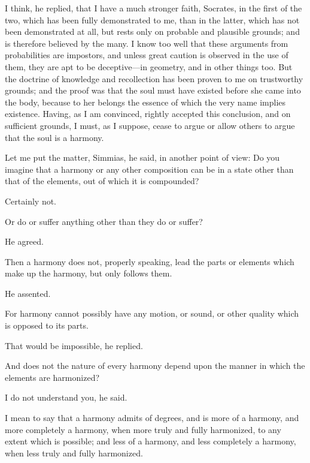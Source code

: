 \documentclass[11pt,letter]{article}
\begin{document}
\par  I think, he replied, that I have a much stronger faith, Socrates, in the first of the two, which has been fully demonstrated to me, than in the latter, which has not been demonstrated at all, but rests only on probable and plausible grounds; and is therefore believed by the many. I know too well that these arguments from probabilities are impostors, and unless great caution is observed in the use of them, they are apt to be deceptive—in geometry, and in other things too. But the doctrine of knowledge and recollection has been proven to me on trustworthy grounds; and the proof was that the soul must have existed before she came into the body, because to her belongs the essence of which the very name implies existence. Having, as I am convinced, rightly accepted this conclusion, and on sufficient grounds, I must, as I suppose, cease to argue or allow others to argue that the soul is a harmony.

\par  Let me put the matter, Simmias, he said, in another point of view: Do you imagine that a harmony or any other composition can be in a state other than that of the elements, out of which it is compounded?

\par  Certainly not.

\par  Or do or suffer anything other than they do or suffer?

\par  He agreed.

\par  Then a harmony does not, properly speaking, lead the parts or elements which make up the harmony, but only follows them.

\par  He assented.

\par  For harmony cannot possibly have any motion, or sound, or other quality which is opposed to its parts.

\par  That would be impossible, he replied.

\par  And does not the nature of every harmony depend upon the manner in which the elements are harmonized?

\par  I do not understand you, he said.

\par  I mean to say that a harmony admits of degrees, and is more of a harmony, and more completely a harmony, when more truly and fully harmonized, to any extent which is possible; and less of a harmony, and less completely a harmony, when less truly and fully harmonized.
\end{document}
